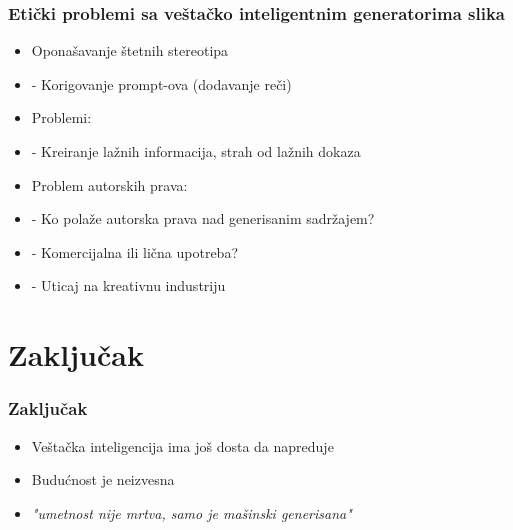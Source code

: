 \documentclass{beamer}
\begin{document}
\begin{frame}[fragile]\frametitle{Etički problemi sa veštačko inteligentnim generatorima slika}
	
	\begin{itemize}
		\item Oponašavanje štetnih stereotipa
        \item[]  - Korigovanje prompt-ova (dodavanje reči)
        \item Problemi:
        \item[] - Kreiranje lažnih informacija, strah od lažnih dokaza
        \item Problem autorskih prava:
		\item[] - Ko polaže autorska prava nad generisanim sadržajem?
		\item[] - Komercijalna ili lična upotreba?
		\item[] - Uticaj na kreativnu industriju
	\end{itemize}	
	
\end{frame}

\section{Zaključak} %

\begin{frame}[fragile]\frametitle{Zaključak}
	\begin{itemize}
		\item Veštačka inteligencija ima još dosta da napreduje
		\item Budućnost je neizvesna
        \item \textit{"umetnost nije mrtva, samo je mašinski generisana"}
	\end{itemize}
\end{frame}
\end{document}

